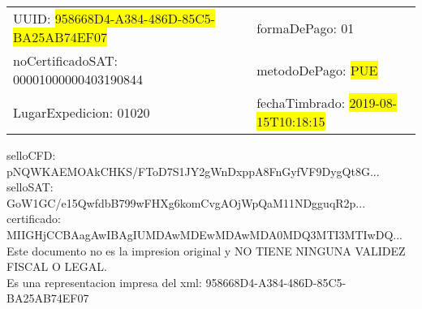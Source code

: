 \documentclass{article}
\begin{document}
\begin{tabular}{p{11cm}p{1cm}p{8cm}}
\bigskip
UUID: \colorbox{yellow}{ 958668D4-A384-486D-85C5-BA25AB74EF07 } & & formaDePago: 01\\

noCertificadoSAT: 00001000000403190844 & & metodoDePago: \colorbox{yellow}{ PUE }\\

LugarExpedicion: 01020 & & fechaTimbrado: \colorbox{yellow}{ 2019-08-15T10:18:15 } \\
\end{tabular}

\bigskip
selloCFD: pNQWKAEMOAkCHKS/FToD7S1JY2gWnDxppA8FnGyfVF9DygQt8G... \\
selloSAT: GoW1GC/e15QwfdbB799wFHXg6komCvgAOjWpQaM11NDgguqR2p... \\

certificado: MIIGHjCCBAagAwIBAgIUMDAwMDEwMDAwMDA0MDQ3MTI3MTIwDQ...\bigskip\bigskip\bigskip\bigskip\bigskip\bigskip
\\Este documento no es la impresion original y NO TIENE NINGUNA VALIDEZ FISCAL O LEGAL. \\
 Es una representacion impresa del xml:  958668D4-A384-486D-85C5-BA25AB74EF07 \\
\end{document}
